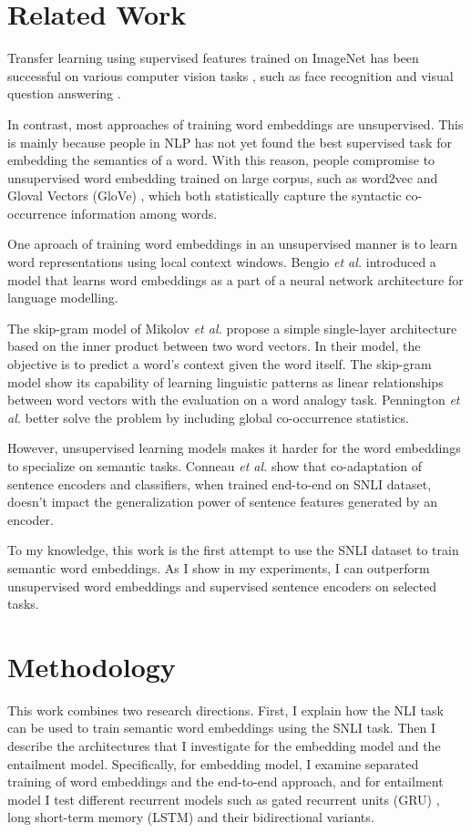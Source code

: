 \documentclass{article}
\newcommand{\etal}{\emph{et al. }}
\begin{document}
\section{Related Work}
Transfer learning using supervised features trained on ImageNet \cite{deng2009imagenet} has been successful on various computer vision tasks \cite{sharif2014cnn}, such as face recognition \cite{taigman2014deepface} and visual question answering \cite{antol2015vqa}.

In contrast, most approaches of training word embeddings are unsupervised. This is mainly because people in NLP has not yet found the best supervised task for embedding the semantics of a word. With this reason, people compromise to unsupervised word embedding trained on large corpus, such as word2vec \cite{mikolov2013distributed} and Gloval Vectors (GloVe) \cite{pennington2014glove}, which both statistically capture the syntactic co-occurrence information among words.

One aproach of training word embeddings in an unsupervised manner is to learn word representations using local context windows. Bengio \etal \cite{bengio2003neural} introduced a model that learns word embeddings as a part of a neural network architecture for language modelling.

The skip-gram model of Mikolov \etal \cite{mikolov2013distributed} propose a simple single-layer architecture based on the inner product between two word vectors. In their model, the objective is to predict a word's context given the word itself. The skip-gram model show its capability of learning linguistic patterns as linear relationships between word vectors with the evaluation on a word analogy task. Pennington \etal better solve the problem by including global co-occurrence statistics.

However, unsupervised learning models makes it harder for the word embeddings to specialize on semantic tasks. Conneau \etal \cite{conneau2017supervised} show that co-adaptation of sentence encoders and classifiers, when trained end-to-end on SNLI dataset, doesn't impact the generalization power of sentence features generated by an encoder.

To my knowledge, this work is the first attempt to use the SNLI dataset to train semantic word embeddings. As I show in my experiments, I can outperform unsupervised word embeddings and supervised sentence encoders on selected tasks.

\section{Methodology}
This work combines two research directions. First, I explain how the NLI task can be used to train semantic word embeddings using the SNLI task. Then I describe the architectures that I investigate for the embedding model and the entailment model. Specifically, for embedding model, I examine separated training of word embeddings and the end-to-end approach, and for entailment model I test different recurrent models such as gated recurrent units (GRU) \cite{chung2014empirical}, long short-term memory (LSTM) \cite{hochreiter1997long} and their bidirectional variants.
\end{document}
